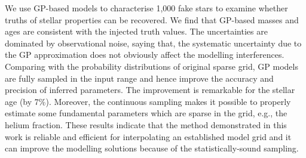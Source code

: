 We use GP-based models to characterise 1,000 fake stars to examine whether truths of stellar properties can be recovered. We find that GP-based masses and ages are consistent with the injected truth values. The uncertainties are dominated by observational noise, saying that, the systematic uncertainty due to the GP approximation does not obviously affect the modelling interferences. Comparing with the probability distributions of original sparse grid, GP models are fully sampled in the input range and hence improve the accuracy and precision of inferred parameters. The improvement is remarkable for the stellar age (by 7\%). Moreover, the continuous sampling makes it possible to properly estimate some fundamental parameters which are sparse in the grid, e.g., the helium fraction. These results indicate that the method demonstrated in this work is reliable and efficient for interpolating an established model grid and it can improve the modelling solutions because of the statistically-sound sampling. 